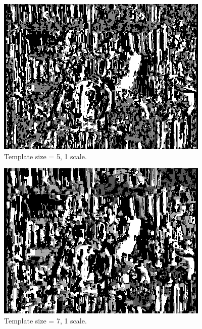 \documentclass[12pt,a4paper,oneside,final]{article}
\begin{document}
\begin{table}[H]
	\centering
	\begin{subtable}{1\textwidth}
		\centering
		\begin{subfigure}[b]{0.24\textwidth}
			\includegraphics[width=\textwidth]{disparity_s1_k5set_1.png}
			\caption{Template size = 5, 1 scale.}
		\end{subfigure}
		\begin{subfigure}[b]{0.24\textwidth}
			\includegraphics[width=\textwidth]{disparity_s1_k7set_1.png}
			\caption{Template size = 7, 1 scale.}
		\end{subfigure}
		\begin{subfigure}[b]{0.24\textwidth}

\end{subfigure}
\end{subtable}
\end{table}
\end{document}

